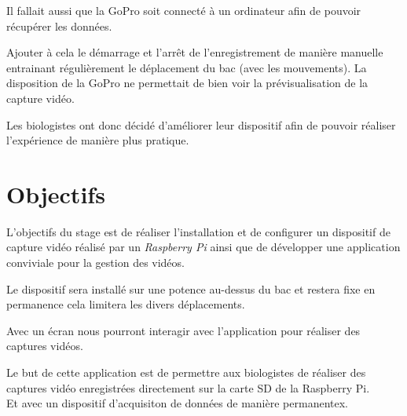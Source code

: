     \vspace{0.1cm}

    \begin{flushleft}
        Il fallait aussi que la GoPro soit connecté à un ordinateur afin de pouvoir récupérer les données.
    \end{flushleft}

    \vspace{0.1cm}

    \begin{flushleft}
        Ajouter à cela le démarrage et l'arrêt de l'enregistrement de manière manuelle entrainant régulièrement le déplacement du bac (avec les mouvements). La disposition de la GoPro ne permettait de bien voir la prévisualisation de la capture vidéo.
    \end{flushleft}

    \vspace{0.1cm}

    \begin{flushleft}
        Les biologistes ont donc décidé d'améliorer leur dispositif afin de pouvoir réaliser l'expérience de manière plus pratique.    
    \end{flushleft}


    \section{Objectifs}
    L'objectifs du stage est de réaliser l'installation et de configurer un dispositif de capture vidéo réalisé par un \textit{Raspberry Pi} ainsi que de développer une application conviviale pour la gestion des vidéos.

    \vspace{0.1cm}

    \begin{flushleft}
        Le dispositif sera installé sur une potence au-dessus du bac et restera fixe en permanence cela limitera les divers déplacements.                
    \end{flushleft}

    \begin{flushleft}
        Avec un écran nous pourront interagir avec l'application pour réaliser des captures vidéos.        
    \end{flushleft}

    \begin{flushleft}
        Le but de cette application est de permettre aux biologistes de réaliser des captures vidéo enregistrées directement sur la carte SD de la Raspberry Pi.\\[0.5cm]

        Et avec un dispositif d'acquisiton de données de manière permanentex.
    \end{flushleft}